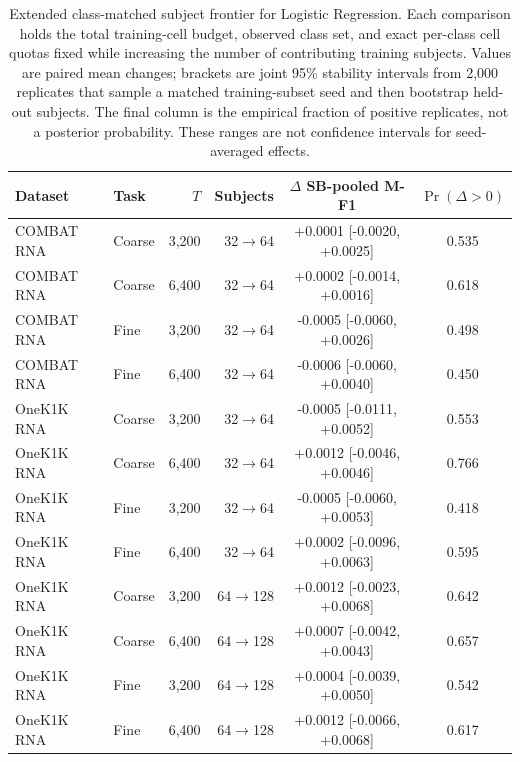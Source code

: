 \begin{table}[H]
\centering
\small
\setlength{\tabcolsep}{5pt}
\begin{tabular}{llrrcc}
\toprule
Dataset & Task & $T$ & Subjects & $\Delta$ SB-pooled M-F1 & $\Pr(\Delta>0)$ \\
\midrule
COMBAT RNA & Coarse & 3,200 & 32$\rightarrow$64 & +0.0001 [-0.0020, +0.0025] & 0.535 \\
COMBAT RNA & Coarse & 6,400 & 32$\rightarrow$64 & +0.0002 [-0.0014, +0.0016] & 0.618 \\
COMBAT RNA & Fine & 3,200 & 32$\rightarrow$64 & -0.0005 [-0.0060, +0.0026] & 0.498 \\
COMBAT RNA & Fine & 6,400 & 32$\rightarrow$64 & -0.0006 [-0.0060, +0.0040] & 0.450 \\
\midrule
OneK1K RNA & Coarse & 3,200 & 32$\rightarrow$64 & -0.0005 [-0.0111, +0.0052] & 0.553 \\
OneK1K RNA & Coarse & 6,400 & 32$\rightarrow$64 & +0.0012 [-0.0046, +0.0046] & 0.766 \\
OneK1K RNA & Fine & 3,200 & 32$\rightarrow$64 & -0.0005 [-0.0060, +0.0053] & 0.418 \\
OneK1K RNA & Fine & 6,400 & 32$\rightarrow$64 & +0.0002 [-0.0096, +0.0063] & 0.595 \\
OneK1K RNA & Coarse & 3,200 & 64$\rightarrow$128 & +0.0012 [-0.0023, +0.0068] & 0.642 \\
OneK1K RNA & Coarse & 6,400 & 64$\rightarrow$128 & +0.0007 [-0.0042, +0.0043] & 0.657 \\
OneK1K RNA & Fine & 3,200 & 64$\rightarrow$128 & +0.0004 [-0.0039, +0.0050] & 0.542 \\
OneK1K RNA & Fine & 6,400 & 64$\rightarrow$128 & +0.0012 [-0.0066, +0.0068] & 0.617 \\
\bottomrule
\end{tabular}
\caption{Extended class-matched subject frontier for Logistic Regression. Each comparison holds the total training-cell budget, observed class set, and exact per-class cell quotas fixed while increasing the number of contributing training subjects. Values are paired mean changes; brackets are joint 95\% stability intervals from 2{,}000 replicates that sample a matched training-subset seed and then bootstrap held-out subjects. The final column is the empirical fraction of positive replicates, not a posterior probability. These ranges are not confidence intervals for seed-averaged effects.}
\label{tab:extended_subject_frontier}
\end{table}

